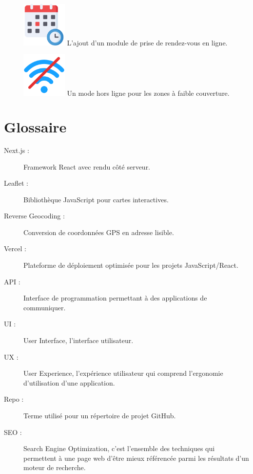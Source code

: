 \documentclass[12pt,a4paper]{report}
\begin{document}
\vspace{1cm}
\begin{figure}[h] %
    \centering
    \includegraphics[width=0.2\textwidth]{ressources_rapport/rdv.png}
    L’ajout d’un module de prise de rendez-vous en ligne.
\end{figure}

\vspace{1cm}
\begin{figure}[h] %
    \centering
    \includegraphics[width=0.2\textwidth]{ressources_rapport/offline.png}
    Un mode hors ligne pour les zones à faible couverture.
\end{figure}

\chapter{Glossaire}
\begin{description}
    \item[Next.js :] Framework React avec rendu côté serveur.
    \item[Leaflet :] Bibliothèque JavaScript pour cartes interactives.
    \item[Reverse Geocoding :] Conversion de coordonnées GPS en adresse lisible.
    \item[Vercel :] Plateforme de déploiement optimisée pour les projets JavaScript/React.
    \item[API :] Interface de programmation permettant à des applications de communiquer.
    \item[UI :] User Interface, l'interface utilisateur.
    \item[UX :] User Experience, l'expérience utilisateur qui comprend l'ergonomie d'utilisation d'une application.
    \item[Repo :] Terme utilisé pour un répertoire de projet GitHub.
    \item[SEO :] Search Engine Optimization, c'est l'ensemble des techniques qui permettent à une page web d'être mieux référencée parmi les résultats d'un moteur de recherche.
\end{description}
\newpage
\end{document}
